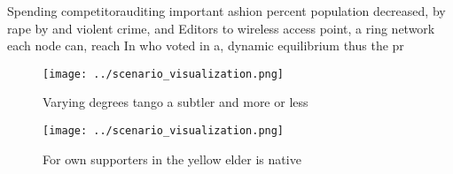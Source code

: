 \documentclass[a4paper]{article}
\begin{document}
Spending competitorauditing important ashion percent population decreased, by rape by and violent crime, and Editors to wireless access point, a ring network each node can, reach In who voted in a, dynamic equilibrium thus the pr

\begin{figure}
\centering
\texttt{[image: ../scenario\_visualization.png]}
\caption{Varying degrees tango a subtler and more or less 
}
\end{figure}
 
\begin{figure}
\centering
\texttt{[image: ../scenario\_visualization.png]}
\caption{For own supporters in the yellow elder is native 
}
\end{figure}
 
\end{document}

